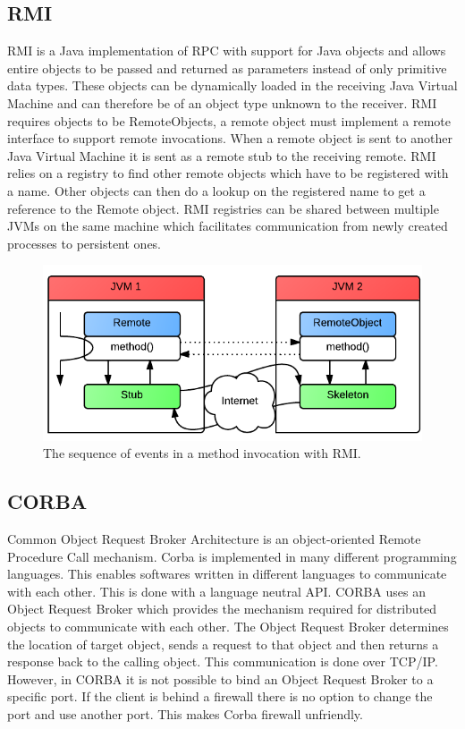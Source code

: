 \subsection{RMI}
RMI is a Java implementation of RPC with support for Java objects and allows entire objects to be passed and returned as parameters instead of only primitive data types. These objects can be dynamically loaded in the receiving Java Virtual Machine and can therefore be of an object type unknown to the receiver. RMI requires objects to be RemoteObjects, a remote object must implement a remote interface to support remote invocations. When a remote object is sent to another Java Virtual Machine it is sent as a remote stub to the receiving remote.
RMI relies on a registry to find other remote objects which have to be registered with a name. Other objects can then do a lookup on the registered name to get a reference to the Remote object. RMI registries can be shared between multiple JVMs on the same machine which facilitates communication from newly created processes to persistent ones.

\begin{figure}[H]
	\centering
    	\includegraphics[scale=0.65]{part_2/remote_procedure_calls/rmi.png}
		\caption{The sequence of events in a method invocation with RMI.}
		\label{rmi} 
\end{figure}

\subsection{CORBA}
Common Object Request Broker Architecture is an object-oriented Remote Procedure Call mechanism. Corba is implemented in many different programming languages. This enables softwares written in different languages to communicate with each other. This is done with a language neutral API. CORBA uses an Object Request Broker which provides the mechanism required for distributed objects to communicate with each other. The Object Request Broker determines the location of target object, sends a request to that object and then returns a response back to the calling object. This communication is done over TCP/IP. However, in CORBA it is not possible to bind an Object Request Broker to a specific port. If the client is behind a firewall there is no option to change the port and use another port. This makes Corba firewall unfriendly.


